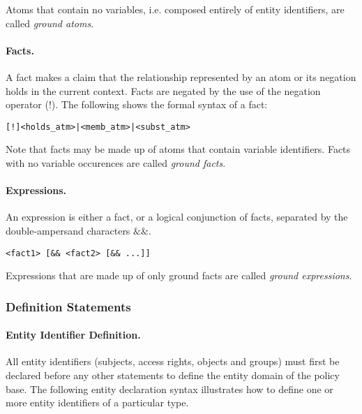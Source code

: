\documentclass[10pt, twocolumn]{article}
\begin{document}
          Atoms that contain no variables, i.e. composed entirely of entity
          identifiers, are called {\em ground atoms}.

        \paragraph{Facts.}
          A fact makes a claim that the relationship represented by an atom or
          its negation holds in the current context. Facts are negated by the
          use of the negation operator ($!$). The following shows the formal
          syntax of a fact:
 
          \begin{verbatim}[!]<holds_atm>|<memb_atm>|<subst_atm>\end{verbatim}

          Note that facts may be made up of atoms that contain variable
          identifiers. Facts with no variable occurences are called
          {\em ground facts}.
 
        \paragraph{Expressions.}
          An expression is either a fact, or a logical conjunction of facts,
          separated by the double-ampersand characters $\&\&$.

          \begin{verbatim}<fact1> [&& <fact2> [&& ...]]\end{verbatim}

          Expressions that are made up of only ground facts are called
          {\em ground expressions}.

      \subsubsection{Definition Statements}

        \paragraph{Entity Identifier Definition.}

          All entity identifiers (subjects, access rights, objects and groups)
          must first be declared before any other statements to define the
          entity domain of the policy base. The following entity declaration
          syntax illustrates how to define one or more entity identifiers of a
          particular type.
\end{document}
